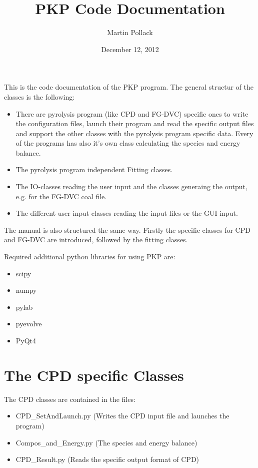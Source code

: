 \documentclass[letterpaper,10pt,english]{sphinxmanual}
\title{PKP Code Documentation}
\date{December 12, 2012}
\author{Martin Pollack}
\begin{document}
\maketitle
\tableofcontents
{}\label{index::doc}


This is the code documentation of the PKP program. The general structur of the classes is the following:
\begin{itemize}
\item {} 
There are pyrolysis program (like CPD and FG-DVC) specific ones to write the configuration files, launch their program and read the specific output files and support the other classes with the pyrolysis program specific data. Every of the programs has also it's own class calculating the species and energy balance.

\item {} 
The pyrolysis program independent Fitting classes.

\item {} 
The IO-classes reading the user input and the classes generaing the output, e.g. for the FG-DVC coal file.

\item {} 
The different user input classes reading the input files or the GUI input.

\end{itemize}

The manual is also structured the same way. Firstly the specific classes for CPD and FG-DVC are introduced, followed by the fitting classes.

Required additional python libraries for using PKP are:
\begin{itemize}
\item {} 
scipy

\item {} 
numpy

\item {} 
pylab

\item {} 
pyevolve

\item {} 
PyQt4

\end{itemize}


\chapter{The CPD specific Classes}
\label{CPDClasses::doc}\label{CPDClasses:the-pkp-code-documentation}\label{CPDClasses:the-cpd-specific-classes}
The CPD classes are contained in the files:
\begin{itemize}
\item {} 
CPD\_SetAndLaunch.py  (Writes the CPD input file and launches the program)

\item {} 
Compos\_and\_Energy.py  (The species and energy balance)

\item {} 
CPD\_Result.py (Reads the specific output format of CPD)

\end{itemize}
\label{CPDClasses:ss-readgen}
\end{document}

